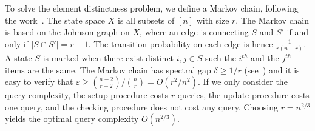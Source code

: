 To solve the element distinctness problem, we define a Markov chain, following the work~\cite{r5,r11,r28}. The state space $X$ is all subsets of $[n]$ with size $r$. The Markov chain is based on the Johnson graph on $X$, where an edge is connecting $S$ and $S'$ if and only if $|S \cap S'| = r-1$. The transition probability on each edge is hence $\frac{1}{r(n-r)}$. A state $S$ is marked when there exist distinct $i, j \in S$ such the $i^{th}$ and the $j^{th}$ items are the same. The Markov chain has spectral gap $\delta \geq 1/r$ (see~\cite{r28}) and it is easy to verify that $\varepsilon \geq \binom{n-2}{r-2}/\binom{n}{r} = O(r^2/n^2)$. If we only consider the query complexity, the setup procedure costs $r$ queries, the update procedure costs one query, and the checking procedure does not cost any query. Choosing $r = n^{2/3}$ yields the optimal query complexity $O(n^{2/3})$.


